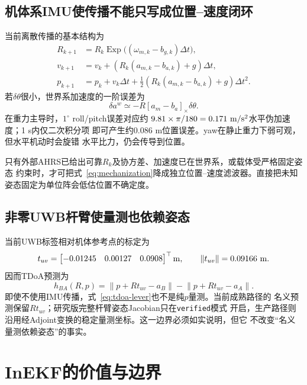 \documentclass[11pt,a4paper]{ctexart}
\newcommand{\Exp}{\operatorname{Exp}}
\newcommand{\norm}[1]{\left\lVert #1\right\rVert}
\begin{document}
\subsection{机体系IMU使传播不能只写成位置--速度闭环}

当前离散传播的基本结构为
\begin{align}
 R_{k+1}&=R_k\Exp\big((\omega_{m,k}-b_{g,k})\Delta t\big),\\
 v_{k+1}&=v_k+\left(R_k(a_{m,k}-b_{a,k})+g\right)\Delta t,\\
 p_{k+1}&=p_k+v_k\Delta t
 +\frac12\left(R_k(a_{m,k}-b_{a,k})+g\right)\Delta t^2.
 \label{eq:mechanization}
\end{align}
若$\delta\theta$很小，世界系加速度的一阶误差为
\begin{equation}
 \delta a^w\simeq-R[a_m-b_a]_\times\delta\theta.
 \label{eq:attitude-to-acc}
\end{equation}
在重力主导时，$1^\circ$ roll/pitch误差对应约
$9.81\times\pi/180=0.171\ {\rm m/s^2}$水平伪加速度；1 s内仅二次积分项
即可产生约$0.086$ m位置误差。yaw在静止重力下弱可观，但水平机动时会旋错
水平比力，仍会传导到位置。

只有外部AHRS已给出可靠$R_k$及协方差、加速度已在世界系，或载体受严格固定姿态
约束时，才可把式~\eqref{eq:mechanization}降成独立位置--速度滤波器。直接把未知
姿态固定为单位阵会低估位置不确定度。

\subsection{非零UWB杆臂使量测也依赖姿态}

当前UWB标签相对机体参考点的标定为
\begin{equation}
 t_{uv}=\begin{bmatrix}-0.01245&0.00127&0.0908\end{bmatrix}^\top {\rm m},
 \qquad \norm{t_{uv}}=0.09166\ {\rm m}.
\end{equation}
因而TDoA预测为
\begin{equation}
 h_{BA}(R,p)=
 \norm{p+Rt_{uv}-a_B}-\norm{p+Rt_{uv}-a_A}.
 \label{eq:tdoa-lever}
\end{equation}
即使不使用IMU传播，式~\eqref{eq:tdoa-lever}也不是纯$p$量测。当前成熟路径的
名义预测保留$Rt_{uv}$；研究版完整杆臂姿态Jacobian只在\texttt{verified}模式
开启，生产路径则沿用经Adjoint变换的稳定量测坐标。这一边界必须如实说明，但它
不改变“名义量测依赖姿态”的事实。

\section{InEKF的价值与边界}
\end{document}
